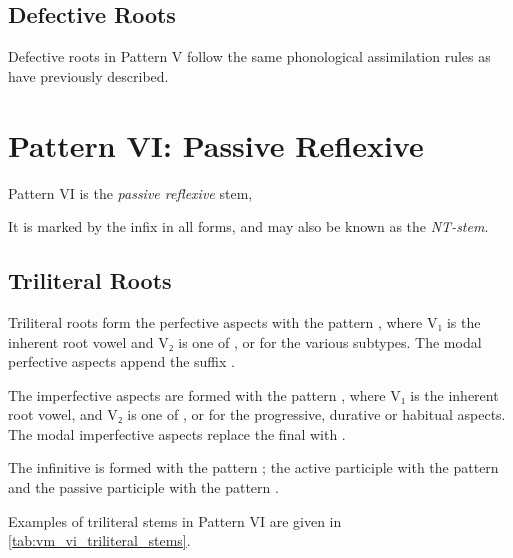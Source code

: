 \documentclass[grammar]{subfiles}
\begin{document}
\subsection{Defective Roots}
\label{ssec:vm_v_defective_roots}

Defective roots in Pattern V follow the same phonological assimilation rules
as have previously described. 


\clearpage
\section{Pattern VI: Passive Reflexive}
\label{sec:vm_pattern_vi}

Pattern VI is the \emph{passive reflexive} stem, 
%

It is marked by the infix  in all forms, and may also be known as the \emph{NT-stem}.


\subsection{Triliteral Roots}
\label{ssec:vm_vi_triliteral_roots}

Triliteral roots form the perfective aspects with the pattern
, where V₁ is the inherent root vowel and V₂ is one of
,  or  for the various subtypes.  The modal perfective
aspects append the suffix .

The imperfective aspects are formed with the pattern ,
where V₁ is the inherent root vowel, and V₂ is one of ,  or
 for the progressive, durative or habitual aspects.  The modal
imperfective aspects replace the final  with .

The infinitive is formed with the pattern ; the active participle
with the pattern  and the passive participle with the pattern
. 

Examples of triliteral stems in Pattern VI are given in \cref{tab:vm_vi_triliteral_stems}. 
\end{document}
